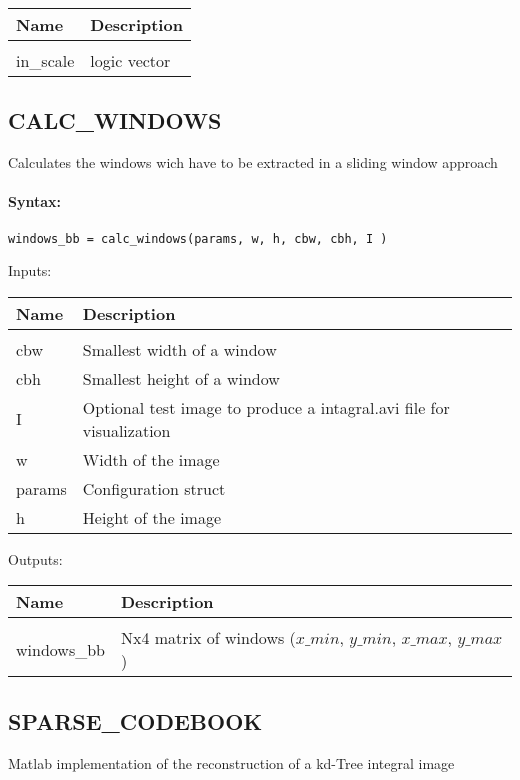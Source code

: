 \begin{tabular}{|l|p{5cm}|}
\hline
\textbf{Name} & \textbf{Description} \\
\hline \hline \\
in\_scale & logic vector  \\ \hline
\end{tabular}

\subsection{CALC\_WINDOWS}

Calculates the windows wich have to be extracted in a sliding window approach

\paragraph{Syntax:} \verb|windows_bb = calc_windows(params, w, h, cbw, cbh, I )|

Inputs:

\begin{tabular}{|l|p{5cm}|}
\hline
\textbf{Name} & \textbf{Description} \\
\hline \hline \\
cbw & Smallest width of a window  \\ \hline
cbh & Smallest height of a window  \\ \hline
I & Optional test image to produce a intagral.avi file for visualization  \\ \hline
w & Width of the image  \\ \hline
params & Configuration struct  \\ \hline
h & Height of the image  \\ \hline
\end{tabular}
Outputs:

\begin{tabular}{|l|p{5cm}|}
\hline
\textbf{Name} & \textbf{Description} \\
\hline \hline \\
windows\_bb & Nx4 matrix of windows ($x\_{min}$, $y\_{min}$, $x\_{max}$, $y\_{max}$)  \\ \hline
\end{tabular}

\subsection{SPARSE\_CODEBOOK}

Matlab implementation of the reconstruction of a kd-Tree integral image

